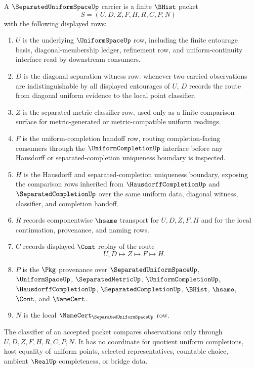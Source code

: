 \begin{definition}
\label{def:separated-uniform-space-carrier}
A $\SeparatedUniformSpaceUp$ carrier is a finite $\BHist$ packet
$$
S=(U,D,Z,F,H,R,C,P,N)
$$
with the following displayed rows:
\begin{enumerate}
\item $U$ is the underlying $\UniformSpaceUp$ row, including the finite entourage basis, diagonal-membership ledger, refinement row, and uniform-continuity interface read by downstream consumers.
\item $D$ is the diagonal separation witness row: whenever two carried observations are indistinguishable by all displayed entourages of $U$, $D$ records the route from diagonal uniform evidence to the local point classifier.
\item $Z$ is the separated-metric classifier row, used only as a finite comparison surface for metric-generated or metric-compatible uniform readings.
\item $F$ is the uniform-completion handoff row, routing completion-facing consumers through the $\UniformCompletionUp$ interface before any Hausdorff or separated-completion uniqueness boundary is inspected.
\item $H$ is the Hausdorff and separated-completion uniqueness boundary, exposing the comparison rows inherited from $\HausdorffCompletionUp$ and $\SeparatedCompletionUp$ over the same uniform data, diagonal witness, classifier, and completion handoff.
\item $R$ records componentwise $\hsame$ transport for $U,D,Z,F,H$ and for the local continuation, provenance, and naming rows.
\item $C$ records displayed $\Cont$ replay of the route
$$
U,D\longmapsto Z\longmapsto F\longmapsto H .
$$
\item $P$ is the $\Pkg$ provenance over $\SeparatedUniformSpaceUp$, $\UniformSpaceUp$, $\SeparatedMetricUp$, $\UniformCompletionUp$, $\HausdorffCompletionUp$, $\SeparatedCompletionUp$, $\BHist$, $\hsame$, $\Cont$, and $\NameCert$.
\item $N$ is the local $\NameCert_{\SeparatedUniformSpaceUp}$ row.
\end{enumerate}
The classifier of an accepted packet compares observations only through $U,D,Z,F,H,R,C,P,N$. It has no coordinate for quotient uniform completions, host equality of uniform points, selected representatives, countable choice, ambient $\RealUp$ completeness, or bridge data.
\end{definition}

